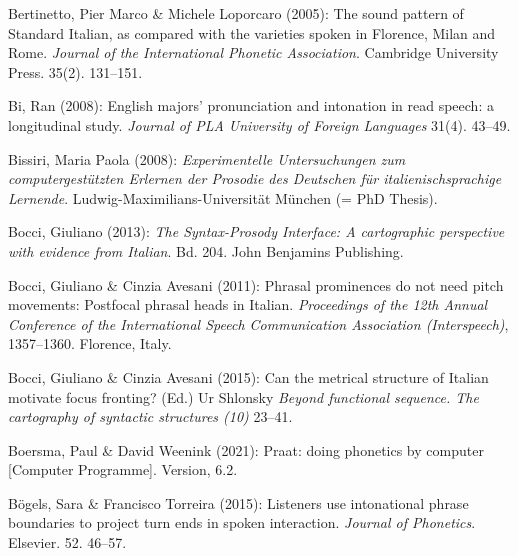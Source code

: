 \begin{styleBibliography}
Bertinetto, Pier Marco \& Michele Loporcaro (2005): The sound pattern of Standard Italian, as compared with the varieties spoken in Florence, Milan and Rome. \textit{Journal of the International Phonetic Association}. Cambridge University Press. 35(2). 131–151.
\end{styleBibliography}

\begin{styleBibliography}
Bi, Ran (2008): English majors’ pronunciation and intonation in read speech: a longitudinal study. \textit{Journal of PLA University of Foreign Languages} 31(4). 43–49.
\end{styleBibliography}

\begin{styleBibliography}
Bissiri, Maria Paola (2008): \textit{Experimentelle Untersuchungen zum computergestützten Erlernen der Prosodie des Deutschen für italienischsprachige Lernende}. Ludwig-Maximilians-Universität München (= PhD Thesis).
\end{styleBibliography}

\begin{styleBibliography}
Bocci, Giuliano (2013): \textit{The Syntax-Prosody Interface: A cartographic perspective with evidence from Italian}. Bd. 204. John Benjamins Publishing.
\end{styleBibliography}

\begin{styleBibliography}
Bocci, Giuliano \& Cinzia Avesani (2011): Phrasal prominences do not need pitch movements: Postfocal phrasal heads in Italian. \textit{Proceedings of the 12th Annual Conference of the International Speech Communication Association (Interspeech)}, 1357–1360. Florence, Italy.
\end{styleBibliography}

\begin{styleBibliography}
Bocci, Giuliano \& Cinzia Avesani (2015): Can the metrical structure of Italian motivate focus fronting? (Ed.) Ur Shlonsky \textit{Beyond functional sequence. The cartography of syntactic structures (10)} 23–41.
\end{styleBibliography}

\begin{styleBibliography}
Boersma, Paul \& David Weenink (2021): Praat: doing phonetics by computer [Computer Programme]. Version, 6.2.
\end{styleBibliography}

\begin{styleBibliography}
Bögels, Sara \& Francisco Torreira (2015): Listeners use intonational phrase boundaries to project turn ends in spoken interaction. \textit{Journal of Phonetics}. Elsevier. 52. 46–57.
\end{styleBibliography}

